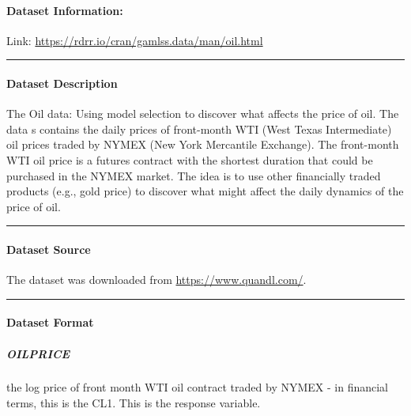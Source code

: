 \documentclass[
]{article}
\begin{document}
\hypertarget{dataset-information}{%
\paragraph{Dataset Information:}\label{dataset-information}}

Link: \url{https://rdrr.io/cran/gamlss.data/man/oil.html}

\begin{center}\rule{0.5\linewidth}{0.5pt}\end{center}

\hypertarget{dataset-description}{%
\paragraph{Dataset Description}\label{dataset-description}}

The Oil data: Using model selection to discover what affects the price
of oil. The data s contains the daily prices of front-month WTI (West
Texas Intermediate) oil prices traded by NYMEX (New York Mercantile
Exchange). The front-month WTI oil price is a futures contract with the
shortest duration that could be purchased in the NYMEX market. The idea
is to use other financially traded products (e.g., gold price) to
discover what might affect the daily dynamics of the price of oil.

\begin{center}\rule{0.5\linewidth}{0.5pt}\end{center}

\hypertarget{dataset-source}{%
\paragraph{Dataset Source}\label{dataset-source}}

The dataset was downloaded from \url{https://www.quandl.com/}.

\begin{center}\rule{0.5\linewidth}{0.5pt}\end{center}

\hypertarget{dataset-format}{%
\paragraph{Dataset Format}\label{dataset-format}}

\hypertarget{oilprice}{%
\subparagraph{OILPRICE}\label{oilprice}}

the log price of front month WTI oil contract traded by NYMEX - in
financial terms, this is the CL1. This is the response variable.
\end{document}
